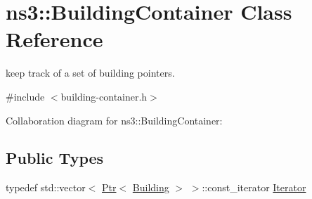 \hypertarget{classns3_1_1BuildingContainer}{}\section{ns3\+:\+:Building\+Container Class Reference}
\label{classns3_1_1BuildingContainer}


keep track of a set of building pointers.  




{\ttfamily \#include $<$building-\/container.\+h$>$}



Collaboration diagram for ns3\+:\+:Building\+Container\+:
\subsection*{Public Types}
\begin{DoxyCompactItemize}
\item 
typedef std\+::vector$<$ \hyperlink{classns3_1_1Ptr}{Ptr}$<$ \hyperlink{classns3_1_1Building}{Building} $>$ $>$\+::const\+\_\+iterator \hyperlink{classns3_1_1BuildingContainer_afe903c6901e047ee0fa356018a0ac445}{Iterator}
\end{DoxyCompactItemize}
